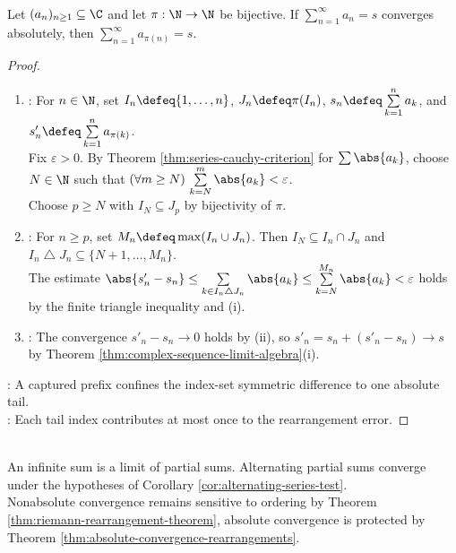 \begin{theorem} \label{thm:absolute-convergence-rearrangements} \\
Let $(a_n)_{n\geq1}\subseteq\C$ and let $\pi:\N\to\N$ be bijective. If $\sum\limits_{n=1}^{\infty}a_n=s$ converges absolutely, then $\sum\limits_{n=1}^{\infty}a_{\pi(n)}=s$.
\begin{proof}
\begin{enumerate}[label=(\roman*)]
\setlength{\itemsep}{0pt}
\item {}: For $n\in\N$, set $I_n\defeq\{1,\ldots,n\}$, $J_n\defeq\pi(I_n)$, $s_n\defeq\sum\limits_{k=1}^{n}a_k$, and $s'_n\defeq\sum\limits_{k=1}^{n}a_{\pi(k)}$.\\
Fix $\varepsilon>0$. By Theorem \ref{thm:series-cauchy-criterion} for $\sum\abs{a_k}$, choose $N\in\N$ such that $(\forall m\geq N)\,\sum\limits_{k=N}^{m}\abs{a_k}<\varepsilon$.\\
Choose $p\geq N$ with $I_N\subseteq J_p$ by bijectivity of $\pi$.
\item {}: For $n\geq p$, set $M_n\defeq\max\limits(I_n\cup J_n)$. Then $I_N\subseteq I_n\cap J_n$ and $I_n\mathbin{\triangle}J_n\subseteq\{N+1,\ldots,M_n\}$.\\
The estimate $\abs{s'_n-s_n}\leq\sum\limits_{k\in I_n\mathbin{\triangle}J_n}\abs{a_k}\leq\sum\limits_{k=N}^{M_n}\abs{a_k}<\varepsilon$ holds by the finite triangle inequality and (i).
\item {}: The convergence $s'_n-s_n\to0$ holds by (ii), so $s'_n=s_n+(s'_n-s_n)\to s$ by Theorem \ref{thm:complex-sequence-limit-algebra}(i).
\end{enumerate}
: A captured prefix confines the index-set symmetric difference to one absolute tail.\\
: Each tail index contributes at most once to the rearrangement error.
\end{proof}
\end{theorem}

\begin{perspective} \label{per:partial-sums-remember-order} \\
An infinite sum is a limit of partial sums. Alternating partial sums converge under the hypotheses of Corollary \ref{cor:alternating-series-test}.\\
Nonabsolute convergence remains sensitive to ordering by Theorem \ref{thm:riemann-rearrangement-theorem}, absolute convergence is protected by Theorem \ref{thm:absolute-convergence-rearrangements}.
\end{perspective}

